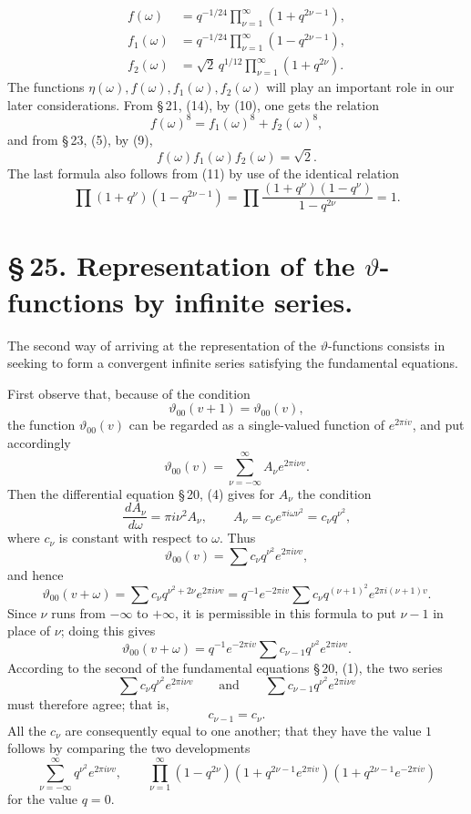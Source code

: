 \documentclass[11pt]{article}
\providecommand{\dd}{\,d}
\providecommand{\tht}{\vartheta}
\begin{document}
\begin{equation}
\begin{aligned}
f(\omega)&=q^{-1/24}\prod_{\nu=1}^{\infty}(1+q^{2\nu-1}),\\
f_1(\omega)&=q^{-1/24}\prod_{\nu=1}^{\infty}(1-q^{2\nu-1}),\\
f_2(\omega)&=\sqrt2\,q^{1/12}\prod_{\nu=1}^{\infty}(1+q^{2\nu}).
\end{aligned}
\tag{11}
\end{equation}
The functions $\eta(\omega), f(\omega), f_1(\omega), f_2(\omega)$ will play an important role in our later considerations. From \S\,21, (14), by (10), one gets the relation
\begin{equation}
f(\omega)^8=f_1(\omega)^8+f_2(\omega)^8,
\tag{12}
\end{equation}
and from \S\,23, (5), by (9),
\begin{equation}
f(\omega)f_1(\omega)f_2(\omega)=\sqrt2.
\tag{13}
\end{equation}
The last formula also follows from (11) by use of the identical relation
\[
\prod(1+q^\nu)(1-q^{2\nu-1})=\prod\frac{(1+q^\nu)(1-q^\nu)}{1-q^{2\nu}}=1.
\]

\section*{\S\,25. Representation of the $\vartheta$-functions by infinite series.}

The second way of arriving at the representation of the $\vartheta$-functions consists in seeking to form a convergent infinite series satisfying the fundamental equations.

First observe that, because of the condition
\[
\tht_{00}(v+1)=\tht_{00}(v),
\]
the function $\tht_{00}(v)$ can be regarded as a single-valued function of $e^{2\pi iv}$, and put accordingly
\[
\tht_{00}(v)=\sum_{\nu=-\infty}^{\infty}A_\nu e^{2\pi i\nu v}.
\]
Then the differential equation \S\,20, (4) gives for $A_\nu$ the condition
\[
\frac{\dd A_\nu}{\dd\omega}=\pi i\nu^2A_\nu,
\qquad
A_\nu=c_\nu e^{\pi i\omega\nu^2}=c_\nu q^{\nu^2},
\]
where $c_\nu$ is constant with respect to $\omega$. Thus
\[
\tht_{00}(v)=\sum c_\nu q^{\nu^2}e^{2\pi i\nu v},
\]
and hence
\[
\tht_{00}(v+\omega)=\sum c_\nu q^{\nu^2+2\nu}e^{2\pi i\nu v}
=q^{-1}e^{-2\pi iv}\sum c_\nu q^{(\nu+1)^2}e^{2\pi i(\nu+1)v}.
\]
Since $\nu$ runs from $-\infty$ to $+\infty$, it is permissible in this formula to put $\nu-1$ in place of $\nu$; doing this gives
\[
\tht_{00}(v+\omega)=q^{-1}e^{-2\pi iv}\sum c_{\nu-1}q^{\nu^2}e^{2\pi i\nu v}.
\]
According to the second of the fundamental equations \S\,20, (1), the two series
\[
\sum c_\nu q^{\nu^2}e^{2\pi i\nu v}\qquad\text{and}\qquad
\sum c_{\nu-1}q^{\nu^2}e^{2\pi i\nu v}
\]
must therefore agree; that is,
\[
c_{\nu-1}=c_\nu.
\]
All the $c_\nu$ are consequently equal to one another; that they have the value $1$ follows by comparing the two developments
\[
\sum_{\nu=-\infty}^{\infty}q^{\nu^2}e^{2\pi i\nu v},\qquad
\prod_{\nu=1}^{\infty}(1-q^{2\nu})(1+q^{2\nu-1}e^{2\pi iv})(1+q^{2\nu-1}e^{-2\pi iv})
\]
for the value $q=0$.
\end{document}
